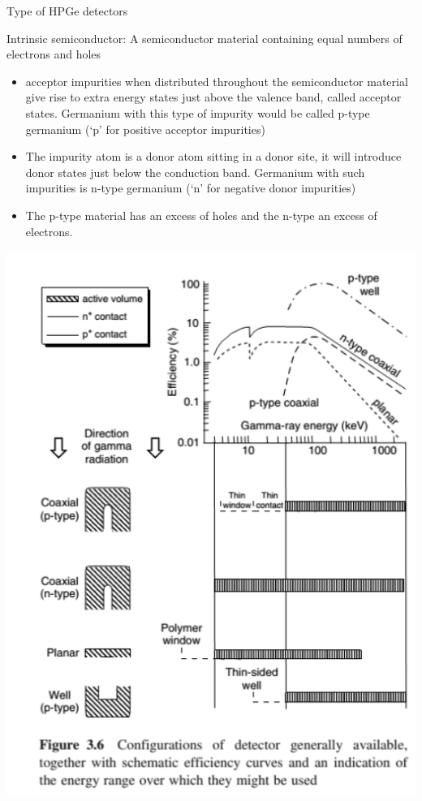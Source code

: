 \begin{frame}[allowframebreaks]{Type of HPGe detectors}

\alert{Intrinsic semiconductor: A semiconductor material containing equal numbers of electrons and holes}


{\small
\begin{itemize}
\item acceptor impurities when distributed throughout the semiconductor material give rise to extra energy states just above the valence band, called acceptor states. Germanium with this type of impurity would be called p-type germanium (‘p’ for positive acceptor impurities) 
\item The impurity atom is a donor atom sitting in a donor site, it will introduce donor states just below the conduction band. Germanium with such impurities is n-type germanium (‘n’ for negative donor impurities)
\item The p-type material has an excess of holes and the n-type an excess of electrons.
\end{itemize}
}


\centering
\includegraphics[scale=0.3]{figures/typehpge.png}

\end{frame}

